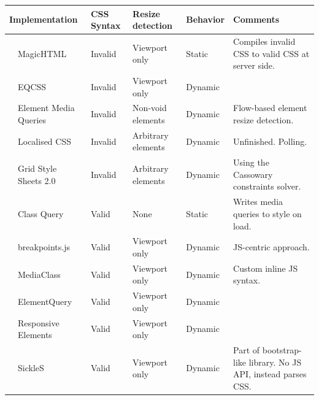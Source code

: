 \documentclass[a4paper,11pt]{kth-mag}
\begin{document}
    \begin{table}[ht]\center
      \tiny
      \begin{tabular}[t]{ l p{3cm} l l l p{3cm} }
        \multicolumn{2}{l}{Implementation} & \gls{CSS} Syntax & Resize detection & Behavior & Comments \\
        \hline
        \cite{eq_imp_magichtml} &             MagicHTML &                                   Invalid &   Viewport only &       Static &    Compiles invalid CSS to valid CSS at server side. \\
        \cite{eq_imp_eqcss} &                 EQCSS &                                       Invalid &   Viewport only &       Dynamic     \\
        \cite{eq_imp_prollyfill-min-width} &  Element Media Queries &                       Invalid &   Non-void elements &   Dynamic &   Flow-based element resize detection. \\
        \cite{eq_imp_localised-css} &         Localised CSS &                               Invalid &   Arbitrary elements &  Dynamic &   Unfinished. Polling. \\
        \cite{eq_imp_gss} &                   Grid Style Sheets 2.0 &                       Invalid &   Arbitrary elements &  Dynamic &   Using the Cassowary constraints solver. \\
        \cite{eq_imp_classquery} &            Class Query &                                 Valid &     None &                Static &    Writes media queries to style on load. \\
        \cite{eq_imp_breakpointsjs} &         breakpoints.js &                              Valid &     Viewport only &       Dynamic &   JS-centric approach. \\
        \cite{eq_imp_mediaclass} &            MediaClass &                                  Valid &     Viewport only &       Dynamic &   Custom inline JS syntax. \\
        \cite{eq_imp_elementquery} &          ElementQuery &                                Valid &     Viewport only &       Dynamic &   \\
        \cite{eq_imp_responsive-elements} &   Responsive Elements &                         Valid &     Viewport only &       Dynamic &   \\
        \cite{eq_imp_sickles} &               SickleS &                                     Valid &     Viewport only &       Dynamic &   Part of bootstrap-like library. No JS API, instead parses CSS. \\

\end{tabular}
\end{table}
\end{document}
